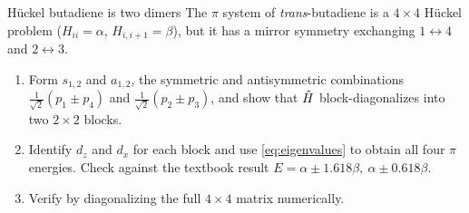 \begin{problem}{H\"uckel butadiene is two dimers}
\label{prob:butadiene}
The $\pi$ system of \emph{trans}-butadiene is a $4\times4$ H\"uckel problem
($H_{ii}=\alpha$, $H_{i,i+1}=\beta$), but it has a mirror symmetry exchanging
$1\leftrightarrow4$ and $2\leftrightarrow3$.
\begin{enumerate}[label=(\alph*),leftmargin=*,itemsep=1pt]
\item Form $s_{1,2}$ and $a_{1,2}$, the symmetric and antisymmetric combinations
$\tfrac{1}{\sqrt2}(p_1\pm p_4)$ and $\tfrac{1}{\sqrt2}(p_2\pm p_3)$, and show that
$\hat{H}$ block-diagonalizes into two $2\times2$ blocks.
\item Identify $d_z$ and $d_x$ for each block and use \cref{eq:eigenvalues} to obtain all
four $\pi$ energies. Check against the textbook result
$E = \alpha\pm1.618\beta,\ \alpha\pm0.618\beta$.
\item Verify by diagonalizing the full $4\times4$ matrix numerically.
\end{enumerate}
\end{problem}


